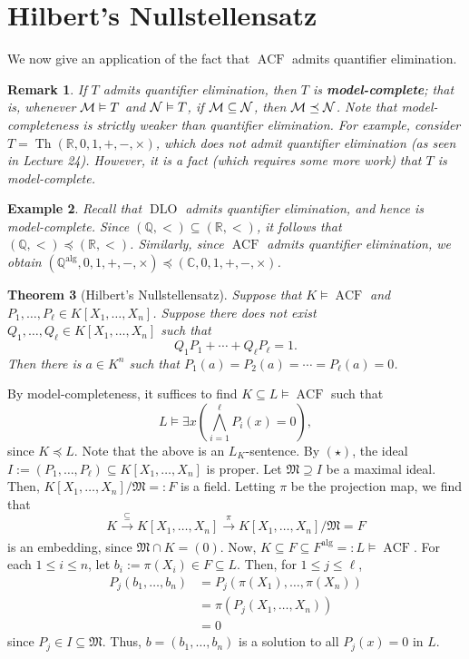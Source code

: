 \documentclass[10pt]{article}
\makeatletter
\newcommand{\R}{\mathbb{R}}
\newcommand{\C}{\mathbb{C}}
\newcommand{\Q}{\mathbb{Q}}
\DeclareMathOperator{\Th}{Th}
\DeclareMathOperator{\ACF}{ACF}
\DeclareMathOperator{\DLO}{DLO}
\DeclareMathOperator{\alg}{alg}
\theoremstyle{newstyle}
\newtheorem{thm}{Theorem}[section]
\newtheorem{remark}[thm]{Remark}
\newtheorem{exmp}[thm]{Example}
\newenvironment{pf}[1][\proofname]{\par
  \pushQED{\qed}%
  \normalfont \topsep0\p@\relax
  \trivlist
  \item[\hskip\labelsep\scshape
  #1\@addpunct{.}]\ignorespaces
}{%
  \popQED\endtrivlist\@endpefalse
}
\makeatother
\begin{document}
\newpage
\section{Hilbert's Nullstellensatz}

We now give an application of the fact that $\ACF$ admits quantifier elimination.

\begin{remark}
If $T$ admits quantifier elimination, then $T$ is {\bf model-complete}; that is,
whenever ${\cal M} \vDash 
T$ and ${\cal N} \vDash T$, if ${\cal M} \subseteq {\cal N}$, then ${\cal M} \preceq {\cal N}$.
Note that model-completeness is strictly weaker than quantifier elimination. For example, 
consider $T = \Th(\R, 0, 1, +, -, \times)$, which does not admit quantifier elimination (as 
seen in Lecture 24). However, it is a fact (which requires some more work) that 
$T$ is model-complete.
\end{remark}

\begin{exmp}
Recall that $\DLO$ admits quantifier elimination, and hence is model-complete. Since 
$(\Q, <) \subseteq (\R, <)$, it follows that $(\Q, <) \preceq (\R, <)$. 
Similarly, since $\ACF$ admits quantifier elimination, we obtain 
$(\Q^{\alg}, 0, 1, +, -, \times) \preceq (\C, 0, 1, +, -, \times)$.
\end{exmp}

\begin{thm}[Hilbert's Nullstellensatz]
Suppose that $K \vDash \ACF$ and $P_1, \dots, P_\ell \in K[X_1, \dots, X_n]$. Suppose 
there does not exist $Q_1, \dots, Q_\ell \in K[X_1, \dots, X_n]$ such that 
\[ Q_1P_1 + \cdots + Q_\ell P_\ell = 1. \tag{$\star$} \]
Then there is $a \in K^n$ such that $P_1(a) = P_2(a) = \cdots = P_\ell(a) = 0$.
\end{thm}
\begin{pf}
By model-completeness, it suffices to find $K \subseteq L \vDash \ACF$ such that 
\[ L \vDash \exists x \left( \bigwedge_{i=1}^\ell P_i(x) = 0 \right), \]
since $K \preceq L$. Note that the above is an $L_K$-sentence. 
By $(\star)$, the ideal $I := (P_1, \dots, P_\ell) \subseteq K[X_1, \dots, X_n]$ is proper. 
Let $\mathfrak{M} \supseteq I$ be a maximal ideal. Then, $K[X_1, \dots, X_n] / 
\mathfrak{M} =: F$ is a field. Letting $\pi$ be the projection map, we find that 
\[ K \xrightarrow[]{\subseteq} K[X_1, \dots, X_n] \xrightarrow[]{\pi} 
K[X_1, \dots, X_n] / \mathfrak{M} = F \]
is an embedding, since $\mathfrak{M} \cap K = (0)$. Now, $K \subseteq F \subseteq F^{\alg} 
=: L \vDash \ACF$. For each $1 \leq i \leq n$, let $b_i := \pi(X_i) \in F \subseteq L$. 
Then, for $1 \leq j \leq \ell$, 
\begin{align*}
    P_j(b_1, \dots, b_n) &= P_j(\pi(X_1), \dots, \pi(X_n)) \\
    &= \pi(P_j(X_1, \dots, X_n)) \\
    &= 0
\end{align*}
since $P_j \in I \subseteq \mathfrak{M}$. Thus, $b = (b_1, \dots, b_n)$ is a solution to
all $P_j(x) = 0$ in $L$.
\end{pf}
\end{document}
